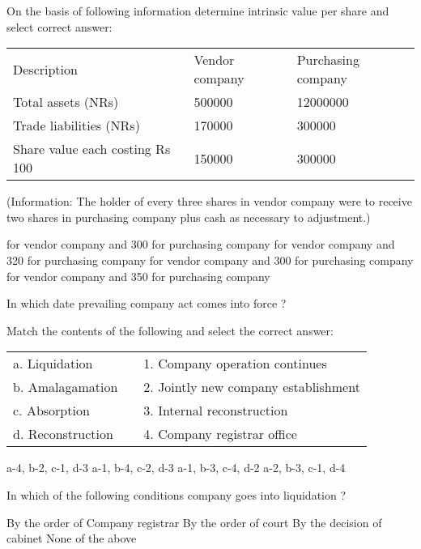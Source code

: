 \begin{questions}
\question On the basis of following information determine intrinsic value per share and select correct answer:
  \begin{table}[h]
  \centering
  \begin{tabular}{lll}
    Description & Vendor company & Purchasing company \\[2mm]
    Total assets (NRs) & 500000 & 12000000 \\
    Trade liabilities (NRs) & 170000 & 300000 \\
    Share value each costing Rs 100 & 150000 & 300000 \\
  \end{tabular}
  \end{table}
  (Information: The holder of every three shares in vendor company were to receive two shares in purchasing company plus cash as necessary to adjustment.)
  \begin{choices}
   for vendor company and 300 for purchasing company
   for vendor company and 320 for purchasing company
   for vendor company and 300 for purchasing company
   for vendor company and 350 for purchasing company
  \end{choices}

\question In which date prevailing company act comes into force ?
  \begin{choices}
  \end{choices}

\question Match the contents of the following and select the correct answer:
  \begin{table}[h]
  \centering
  \begin{tabular}{lll}
    a. Liquidation & & 1. Company operation continues \\[2mm]
    b. Amalagamation & & 2. Jointly new company establishment \\
    c. Absorption & & 3. Internal reconstruction \\
    d. Reconstruction & & 4. Company registrar office \\
  \end{tabular}
  \end{table}
  \begin{choices}
  \choice a-4, b-2, c-1, d-3
  \choice a-1, b-4, c-2, d-3
  \choice a-1, b-3, c-4, d-2
  \choice a-2, b-3, c-1, d-4
  \end{choices}

\question In which of the following conditions company goes into liquidation ?
  \begin{choices}
  \choice By the order of Company registrar
  \choice By the order of court
  \choice By the decision of cabinet
  \choice None of the above
  \end{choices}


\end{questions}
